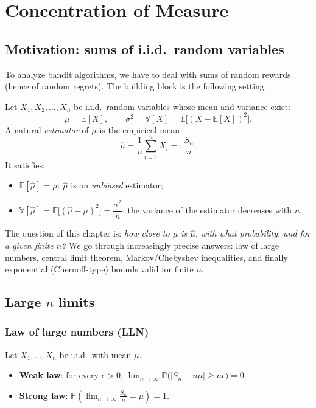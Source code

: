 

\section{Concentration of Measure}

\subsection{Motivation: sums of i.i.d.\ random variables}

To analyze bandit algorithms, we have to deal with sums of random rewards (hence of random regrets). The building block is the following setting.

Let $X_1, X_2, \dots, X_n$ be i.i.d.\ random variables whose mean and variance exist:
\[
\mu = \mathbb{E}[X], \qquad \sigma^2 = \mathbb{V}[X] = \mathbb{E}\big[(X - \mathbb{E}[X])^2\big].
\]
A natural \emph{estimator} of $\mu$ is the empirical mean
\[
\hat{\mu} = \frac{1}{n}\sum_{i=1}^n X_i =: \frac{S_n}{n}.
\]
It satisfies:
\begin{itemize}
    \item $\mathbb{E}[\hat{\mu}] = \mu$: $\hat{\mu}$ is an \emph{unbiased} estimator;
    \item $\mathbb{V}[\hat{\mu}] = \mathbb{E}\big[(\hat{\mu} - \mu)^2\big] = \dfrac{\sigma^2}{n}$: the variance of the estimator decreases with $n$.
\end{itemize}

The question of this chapter is: \emph{how close to $\mu$ is $\hat{\mu}$, with what probability, and for a given finite $n$?} We go through increasingly precise answers: law of large numbers, central limit theorem, Markov/Chebyshev inequalities, and finally exponential (Chernoff-type) bounds valid for finite $n$.

\subsection{Large $n$ limits}

\subsubsection*{Law of large numbers (LLN)}

\begin{theorem}
Let $X_1, \dots, X_n$ be i.i.d.\ with mean $\mu$.
\begin{itemize}
    \item \textbf{Weak law}: for every $\epsilon > 0$, $\displaystyle \lim_{n \to \infty} \mathbb{P}\big(|S_n - n\mu| \geq n\epsilon\big) = 0$.
    \item \textbf{Strong law}: $\displaystyle \mathbb{P}\left(\lim_{n \to \infty} \frac{S_n}{n} = \mu\right) = 1$.
\end{itemize}
\end{theorem}


